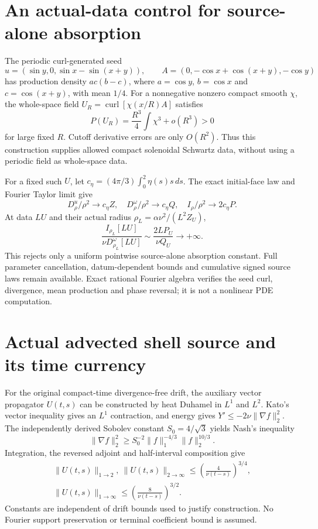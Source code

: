\documentclass[11pt]{article}
\begin{document}
\section{An actual-data control for source-alone absorption}
The periodic curl-generated seed
\[
 u=(\sin y,0,\sin x-\sin(x+y)),\qquad
 A=(0,-\cos x+\cos(x+y),-\cos y)
\]
has production density $ac(b-c)$, where $a=\cos y$, $b=\cos x$ and
$c=\cos(x+y)$, with mean $1/4$. For a nonnegative nonzero compact
smooth $\chi$, the whole-space field $U_R=\operatorname{curl}
[\chi(x/R)A]$ satisfies
\[
 P(U_R)=\frac{R^3}{4}\int\chi^3+o(R^3)>0
\]
for large fixed $R$. Cutoff derivative errors are only $O(R^2)$.
Thus this construction supplies allowed compact solenoidal Schwartz
data, without using a periodic field as whole-space data.

For a fixed such $U$, let
$c_\eta=(4\pi/3)\int_0^2\eta(s)s\,ds$. The exact initial-face law
and Fourier Taylor limit give
\[
 D^u_\rho/\rho^2\longrightarrow c_\eta Z,\quad
 D^\omega_\rho/\rho^2\longrightarrow c_\eta Q,\quad
 I_\rho/\rho^2\longrightarrow2c_\eta P.
\]
At data $LU$ and their actual radius
$\rho_L=\alpha\nu^2/(L^2Z_U)$,
\[
 \frac{I_{\rho_L}[LU]}{\nu D^\omega_{\rho_L}[LU]}
 \sim\frac{2LP_U}{\nu Q_U}\longrightarrow+\infty.
\]
This rejects only a uniform pointwise source-alone absorption constant.
Full parameter cancellation, datum-dependent bounds and cumulative signed
source laws remain available. Exact rational Fourier algebra verifies the
seed curl, divergence, mean production and phase reversal; it is not a
nonlinear PDE computation.


\section{Actual advected shell source and its time currency}
For the original compact-time divergence-free drift, the auxiliary vector
propagator $U(t,s)$ can be constructed by heat Duhamel in $L^1$ and $L^2$.
Kato's vector inequality gives an $L^1$ contraction, and energy gives
$Y'\le-2\nu\|\nabla f\|_2^2$. The independently derived Sobolev constant
$S_0=4/\sqrt3$ yields Nash's inequality
\[
 \|\nabla f\|_2^2\ge S_0^{-2}\|f\|_1^{-4/3}\|f\|_2^{10/3}.
\]
Integration, the reversed adjoint and half-interval composition give
\[
 \begin{gathered}
 \|U(t,s)\|_{1\to2},\ \|U(t,s)\|_{2\to\infty}
 \le\left(\frac4{\nu(t-s)}\right)^{3/4},\\
 \|U(t,s)\|_{1\to\infty}
 \le\left(\frac8{\nu(t-s)}\right)^{3/2}.
 \end{gathered}
\]
Constants are independent of drift bounds used to justify construction.
No Fourier support preservation or terminal coefficient bound is assumed.
\end{document}

